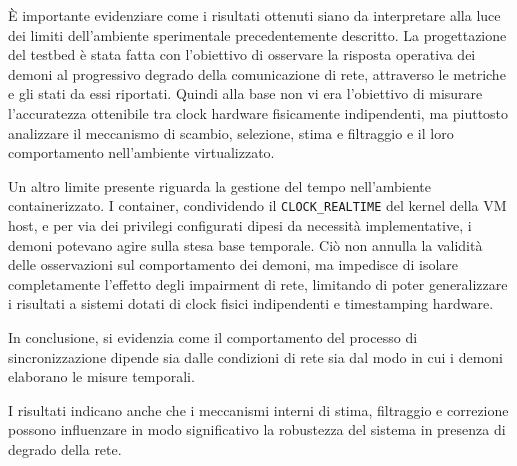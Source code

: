 È importante evidenziare come i risultati ottenuti siano da interpretare alla luce dei limiti dell'ambiente
sperimentale precedentemente descritto. La progettazione del testbed è stata fatta con l'obiettivo di 
osservare la risposta operativa dei demoni al progressivo degrado della comunicazione di rete, 
attraverso le metriche e gli stati da essi riportati. 
Quindi alla base non vi era l'obiettivo di misurare l'accuratezza ottenibile tra clock hardware fisicamente indipendenti, 
ma piuttosto analizzare il meccanismo di scambio, selezione, stima e filtraggio e il loro comportamento nell'ambiente virtualizzato.

Un altro limite presente riguarda la gestione del tempo nell'ambiente containerizzato. I container, condividendo 
il \texttt{CLOCK\_REALTIME} del kernel della VM host, e per via dei privilegi configurati dipesi da necessità implementative,
i demoni potevano agire sulla stesa base temporale. Ciò non annulla la validità delle osservazioni sul comportamento dei demoni, 
ma impedisce di isolare completamente l'effetto degli impairment di rete, limitando di poter generalizzare i risultati
a sistemi dotati di clock fisici indipendenti e timestamping hardware.

In conclusione, si evidenzia come il comportamento del processo di sincronizzazione dipende sia dalle condizioni 
di rete sia dal modo in cui i demoni elaborano le misure temporali.

I risultati indicano anche che i meccanismi interni di stima, filtraggio e correzione possono 
influenzare in modo significativo la robustezza del sistema in presenza di degrado della rete.
